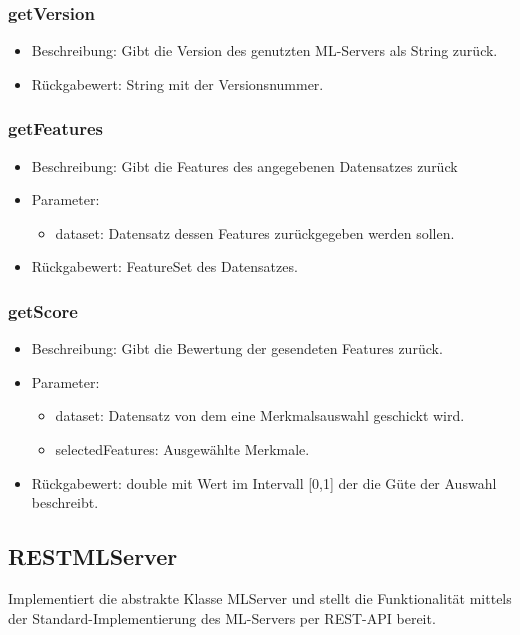 \documentclass[a4paper]{scrreprt}
\begin{document}
	\subsubsection{getVersion}
	\begin{itemize}
		\item Beschreibung: Gibt die Version des genutzten ML-Servers als String zurück.
		\item Rückgabewert: String mit der Versionsnummer.
	\end{itemize}

	\subsubsection{getFeatures}
	\begin{itemize}
		\item Beschreibung: Gibt die Features des angegebenen Datensatzes zurück
		\item Parameter:
		\begin{itemize}
			\item dataset: Datensatz dessen Features zurückgegeben werden sollen.
		\end{itemize}
		\item Rückgabewert: FeatureSet des Datensatzes.
	\end{itemize}

	\subsubsection{getScore}
	\begin{itemize}
		\item Beschreibung: Gibt die Bewertung der gesendeten Features zurück.
		\item Parameter:
		\begin{itemize}
			\item dataset: Datensatz von dem eine Merkmalsauswahl geschickt wird.
			\item selectedFeatures: Ausgewählte Merkmale.
		\end{itemize}
		\item Rückgabewert: double mit Wert im Intervall [0,1] der die Güte der Auswahl beschreibt.
	\end{itemize}

	\subsection{RESTMLServer}
	Implementiert die abstrakte Klasse MLServer und stellt die Funktionalität mittels der Standard-Implementierung des ML-Servers per REST-API bereit.
\end{document}
